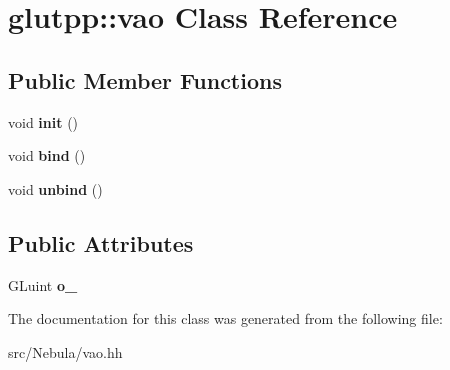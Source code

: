 \hypertarget{classglutpp_1_1vao}{\section{glutpp\-:\-:vao \-Class \-Reference}
\label{classglutpp_1_1vao}
}
\subsection*{\-Public \-Member \-Functions}
\begin{DoxyCompactItemize}
\item 
\hypertarget{classglutpp_1_1vao_a8ef0f944ab05f251bb7c2b9c938a32b6}{void {\bfseries init} ()}\label{classglutpp_1_1vao_a8ef0f944ab05f251bb7c2b9c938a32b6}

\item 
\hypertarget{classglutpp_1_1vao_ad162a38b7f0e9749bd6a6c917db70c0c}{void {\bfseries bind} ()}\label{classglutpp_1_1vao_ad162a38b7f0e9749bd6a6c917db70c0c}

\item 
\hypertarget{classglutpp_1_1vao_a2982afed99f8a8bc13ccd27b73f6121d}{void {\bfseries unbind} ()}\label{classglutpp_1_1vao_a2982afed99f8a8bc13ccd27b73f6121d}

\end{DoxyCompactItemize}
\subsection*{\-Public \-Attributes}
\begin{DoxyCompactItemize}
\item 
\hypertarget{classglutpp_1_1vao_a8b6c13fec6c3ecae720c6a3e54560a8d}{\-G\-Luint {\bfseries o\-\_\-}}\label{classglutpp_1_1vao_a8b6c13fec6c3ecae720c6a3e54560a8d}

\end{DoxyCompactItemize}


\-The documentation for this class was generated from the following file\-:\begin{DoxyCompactItemize}
\item 
src/\-Nebula/vao.\-hh\end{DoxyCompactItemize}
